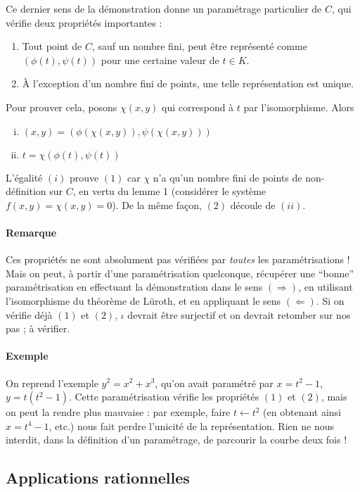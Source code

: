 \documentclass[a4paper, 11pt]{article}
\theoremstyle{definition}
\begin{document}
Ce dernier sens de la démonstration donne un paramétrage particulier
de $C$, qui vérifie deux propriétés importantes :
\begin{enumerate}[(1)]
\item Tout point de $C$, sauf un nombre fini, peut être représenté
  comme $(\phi(t),\psi(t))$ pour une certaine valeur de $t \in K$.
\item À l'exception d'un nombre fini de points, une telle
  représentation est unique.
\end{enumerate}
Pour prouver cela, posons $\chi(x,y)$ qui correspond à $t$ par
l'isomorphisme. Alors
\begin{enumerate}[(i)]
\item $(x,y) = (\phi(\chi(x,y)), \psi(\chi(x,y)))$
\item $t = \chi(\phi(t),\psi(t))$
\end{enumerate}
L'égalité $(i)$ prouve $(1)$ car $\chi$ n'a qu'un nombre fini de
points de non-définition sur $C$, en vertu du lemme 1 (considérer le
système $f(x,y) = \chi(x,y) = 0$). De la même façon, $(2)$ découle de
$(ii)$.

\paragraph{Remarque} Ces propriétés ne sont absolument pas vérifiées
par \emph{toutes} les paramétrisations ! Mais on peut, à partir d'une
paramétrisation quelconque, récupérer une \enquote{bonne}
paramétrisation en effectuant la démonstration dans le sens
$(\Rightarrow)$, en utilisant l'isomorphisme du théorème de Lüroth, et
en appliquant le sens $(\Leftarrow)$. Si on vérifie déjà $(1)$ et
$(2)$, $\iota$ devrait être surjectif et on devrait retomber sur nos
pas ; à vérifier.

\paragraph{Exemple} On reprend l'exemple $y^2 = x^2 + x^3$, qu'on
avait paramétré par $x = t^2 - 1$, $y = t(t^2 - 1)$. Cette
paramétrisation vérifie les propriétés $(1)$ et $(2)$, mais on peut la
rendre plus mauvaise : par exemple, faire $t \leftarrow t^2$ (en
obtenant ainsi $x = t^4 - 1$, etc.) nous fait perdre l'unicité de la
représentation. Rien ne nous interdit, dans la définition d'un
paramétrage, de parcourir la courbe deux fois !

\subsection{Applications rationnelles}
\end{document}
